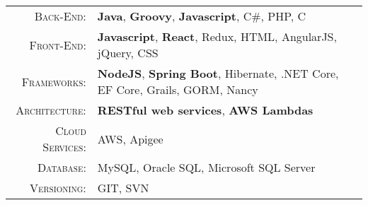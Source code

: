 %
%
%

\renewcommand{\arraystretch}{1.1}
	\begin{tabular}{>{}r>{}p{13cm}}
		\textsc{Back-End:}			&	\textbf{Java}, \textbf{Groovy}, \textbf{Javascript}, C\#, PHP, C\\
		\textsc{Front-End:}			&	\textbf{Javascript}, \textbf{React}, Redux, HTML, AngularJS, jQuery, CSS\\
		\textsc{Frameworks:}		&	\textbf{NodeJS}, \textbf{Spring Boot}, Hibernate, .NET Core, EF Core, Grails, GORM, Nancy\\
		\textsc{Architecture:}	&	\textbf{RESTful web services}, \textbf{AWS Lambdas}\\
		\textsc{Cloud Services:}&	AWS, Apigee\\
		\textsc{Database:}			&	MySQL, Oracle SQL, Microsoft SQL Server\\
		\textsc{Versioning:}		&	GIT, SVN\\
	\end{tabular}\\
